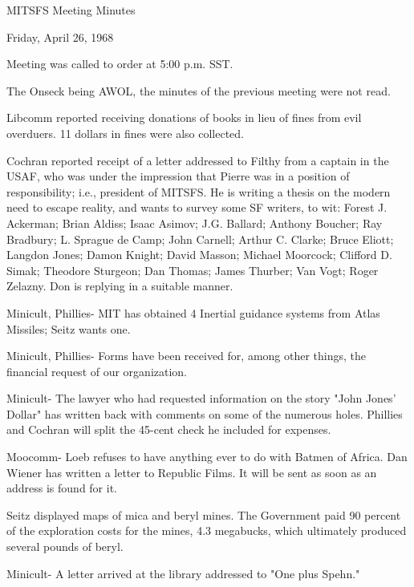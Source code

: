 \documentclass[12pt]{article}
\begin{document}
\begin{center}

MITSFS Meeting Minutes

Friday, April 26, 1968

\end{center}
 
\vspace{12pt}

\setlength{\parskip}{6pt}

\noindent
Meeting was called to order at 5:00 p.m. SST.

The Onseck being AWOL, the minutes of the previous meeting were not read.

Libcomm reported receiving donations of books in lieu of fines from evil overduers. 11 dollars in fines were also collected.

Cochran reported receipt of a letter addressed to Filthy from a captain in the USAF, who was under the impression that Pierre was in a position of responsibility; i.e., president of MITSFS. He is writing a thesis on the modern need to escape reality, and wants to survey some SF writers, to wit: Forest J. Ackerman; Brian Aldiss; Isaac Asimov; J.G. Ballard; Anthony Boucher; Ray Bradbury; L. Sprague de Camp; John Carnell; Arthur C. Clarke; Bruce Eliott; Langdon Jones; Damon Knight; David Masson; Michael Moorcock; Clifford D. Simak; Theodore Sturgeon; Dan Thomas; James Thurber; Van Vogt; Roger Zelazny. Don is replying in a suitable manner.

Minicult, Phillies- MIT has obtained 4 Inertial guidance systems from Atlas Missiles; Seitz wants one.

Minicult, Phillies- Forms have been received for, among other things, the financial request of our organization.

Minicult- The lawyer who had requested information on the story "John Jones' Dollar" has written back with comments on some of the numerous holes. Phillies and Cochran will split the 45-cent check he included for expenses.

Moocomm- Loeb refuses to have anything ever to do with Batmen of Africa. Dan Wiener has written a letter to Republic Films. It will be sent as soon as an address is found for it.

Seitz displayed maps of mica and beryl mines. The Government paid 90 percent of the exploration costs for the mines, 4.3 megabucks, which ultimately produced several pounds of beryl.

Minicult- A letter arrived at the library addressed to "One plus Spehn."
\end{document}
